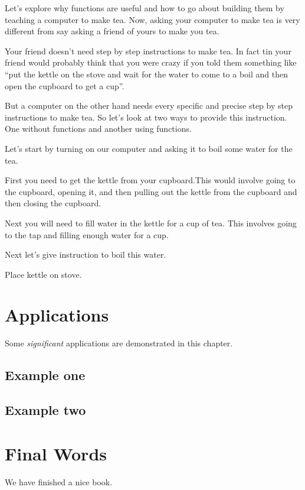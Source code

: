 \documentclass[
]{book}
\begin{document}
Let's explore why functions are useful and how to go about building them by teaching a computer to make tea. Now, asking your computer to make tea is very different from say asking a friend of yours to make you tea.

Your friend doesn't need step by step instructions to make tea. In fact tin your friend would probably think that you were crazy if you told them something like ``put the kettle on the stove and wait for the water to come to a boil and then open the cupboard to get a cup''.

But a computer on the other hand needs every specific and precise step by step instructions to make tea. So let's look at two ways to provide this instruction. One without functions and another using functions.

Let's start by turning on our computer and asking it to boil some water for the tea.

First you need to get the kettle from your cupboard.This would involve going to the cupboard, opening it, and then pulling out the kettle from the cupboard and then closing the cupboard.

Next you will need to fill water in the kettle for a cup of tea. This involves going to the tap and filling enough water for a cup.

Next let's give instruction to boil this water.

Place kettle on stove.

\hypertarget{applications}{%
\chapter{Applications}\label{applications}}

Some \emph{significant} applications are demonstrated in this chapter.

\hypertarget{example-one}{%
\section{Example one}\label{example-one}}

\hypertarget{example-two}{%
\section{Example two}\label{example-two}}

\hypertarget{final-words}{%
\chapter{Final Words}\label{final-words}}

We have finished a nice book.

  
\end{document}
